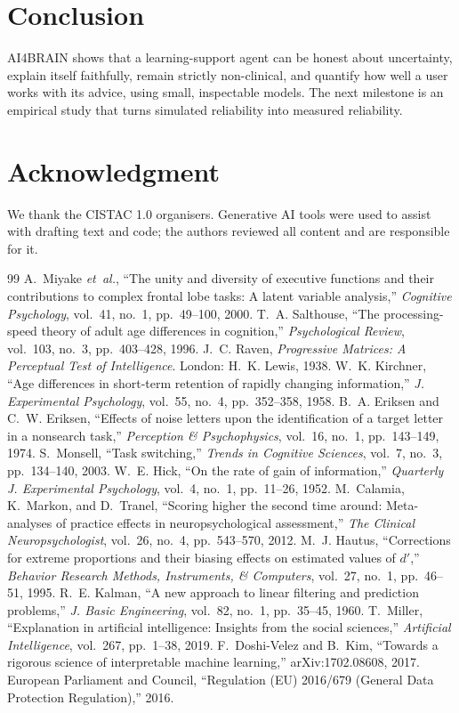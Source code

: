 \documentclass[conference]{IEEEtran}
\begin{document}
\section{Conclusion}
AI4BRAIN shows that a learning-support agent can be honest about uncertainty, explain itself faithfully, remain strictly non-clinical, and quantify how well a user works with its advice, using small, inspectable models. The next milestone is an empirical study that turns simulated reliability into measured reliability.

\section*{Acknowledgment}
We thank the CISTAC 1.0 organisers. Generative AI tools were used to assist with drafting text and code; the authors reviewed all content and are responsible for it.

\begin{thebibliography}{99}
 A.~Miyake \emph{et~al.}, ``The unity and diversity of executive functions and their contributions to complex frontal lobe tasks: A latent variable analysis,'' \emph{Cognitive Psychology}, vol.~41, no.~1, pp.~49--100, 2000.
 T.~A. Salthouse, ``The processing-speed theory of adult age differences in cognition,'' \emph{Psychological Review}, vol.~103, no.~3, pp.~403--428, 1996.
 J.~C. Raven, \emph{Progressive Matrices: A Perceptual Test of Intelligence}. London: H.~K. Lewis, 1938.
 W.~K. Kirchner, ``Age differences in short-term retention of rapidly changing information,'' \emph{J. Experimental Psychology}, vol.~55, no.~4, pp.~352--358, 1958.
 B.~A. Eriksen and C.~W. Eriksen, ``Effects of noise letters upon the identification of a target letter in a nonsearch task,'' \emph{Perception \& Psychophysics}, vol.~16, no.~1, pp.~143--149, 1974.
 S.~Monsell, ``Task switching,'' \emph{Trends in Cognitive Sciences}, vol.~7, no.~3, pp.~134--140, 2003.
 W.~E. Hick, ``On the rate of gain of information,'' \emph{Quarterly J. Experimental Psychology}, vol.~4, no.~1, pp.~11--26, 1952.
 M.~Calamia, K.~Markon, and D.~Tranel, ``Scoring higher the second time around: Meta-analyses of practice effects in neuropsychological assessment,'' \emph{The Clinical Neuropsychologist}, vol.~26, no.~4, pp.~543--570, 2012.
 M.~J. Hautus, ``Corrections for extreme proportions and their biasing effects on estimated values of $d'$,'' \emph{Behavior Research Methods, Instruments, \& Computers}, vol.~27, no.~1, pp.~46--51, 1995.
 R.~E. Kalman, ``A new approach to linear filtering and prediction problems,'' \emph{J. Basic Engineering}, vol.~82, no.~1, pp.~35--45, 1960.
 T.~Miller, ``Explanation in artificial intelligence: Insights from the social sciences,'' \emph{Artificial Intelligence}, vol.~267, pp.~1--38, 2019.
 F.~Doshi-Velez and B.~Kim, ``Towards a rigorous science of interpretable machine learning,'' arXiv:1702.08608, 2017.
 European Parliament and Council, ``Regulation (EU) 2016/679 (General Data Protection Regulation),'' 2016.
\end{thebibliography}
\end{document}
